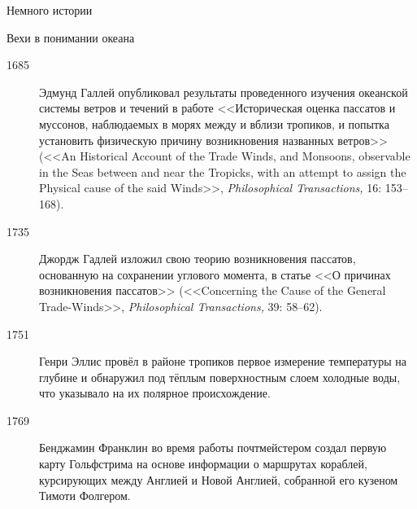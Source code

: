 \begin{chapter}{Немного истории}
\begin{section}{Вехи в понимании океана}
\begin{description}
\item[1685] Эдмунд Галлей опубликовал результаты проведенного
изучения океанской системы ветров и течений в работе <<Историческая оценка 
пассатов и муссонов, наблюдаемых в морях между и вблизи тропиков, 
и попытка установить физическую причину возникновения
названных ветров>> (<<An Historical Account of the Trade Winds, and
Monsoons, observable in the Seas between and near the Tropicks, with
an attempt to assign the Physical cause of the said Winds>>, 
\textsl{Philosophical Transactions,} 16: 153--168).
%

\item[1735] Джордж Гадлей изложил свою теорию возникновения
пассатов, основанную на сохранении углового момента, в статье
<<О причинах возникновения пассатов>> (<<Concerning the Cause of
the General Trade-Winds>>, \textsl{Philosophical Transactions,} 39: 58--62).
%



\item[1751] Генри Эллис провёл в районе тропиков первое
измерение температуры на глубине и обнаружил под тёплым поверхностным
слоем холодные воды, что указывало на их полярное происхождение.
%

\item[1769] Бенджамин Франклин во время работы почтмейстером 
создал первую карту Гольфстрима на основе информации о маршрутах кораблей, 
курсирующих между Англией и Новой Англией, собранной его кузеном 
Тимоти Фолгером.
%


\end{description}
\end{section}
\end{chapter}
